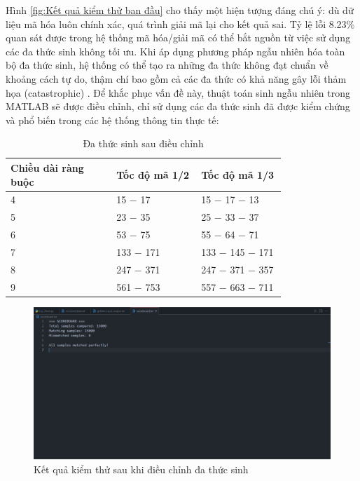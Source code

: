 \documentclass[../DoAn.tex]{subfiles}
\begin{document}
Hình \ref{fig:Kết quả kiểm thử ban đầu} cho thấy một hiện tượng đáng chú ý: dù dữ liệu mã hóa luôn chính xác, quá trình giải mã lại cho kết quả sai. Tỷ lệ lỗi 8.23\% quan sát được trong hệ thống mã hóa/giải mã có thể bắt nguồn từ việc sử dụng các đa thức sinh không tối ưu. Khi áp dụng phương pháp ngẫu nhiên hóa toàn bộ đa thức sinh, hệ thống có thể tạo ra những đa thức không đạt chuẩn về khoảng cách tự do, thậm chí bao gồm cả các đa thức có khả năng gây lỗi thảm họa (catastrophic) \cite{forney_convolutional_1970}\cite{masseyy_inverses_1968}. Để khắc phục vấn đề này, thuật toán sinh ngẫu nhiên trong MATLAB sẽ được điều chỉnh, chỉ sử dụng các đa thức sinh đã được kiểm chứng và phổ biến trong các hệ thống thông tin thực tế:

\begin{table}[H]
\centering{}
    \caption{Đa thức sinh sau điều chỉnh}
    \begin{tabular}{|p{0.3\linewidth} | p{0.24\linewidth} |p{0.24\linewidth}|}
        \hline
        \textbf{Chiều dài ràng buộc} & \textbf{Tốc độ mã 1/2} & \textbf{Tốc độ mã 1/3}\\ \hline\hline
        4  & 15 $-$ 17 & 15 $-$ 17 $-$ 13          \\ \hline
        5   & 23 $-$ 35 & 25 $-$ 33 $-$ 37         \\ \hline
        6   & 53 $-$ 75 & 55 $-$ 64 $-$ 71          \\ \hline
        7  & 133 $-$ 171 & 133 $-$ 145 $-$ 171 \\ \hline
        8 & 247 $-$ 371 & 247 $-$ 371 $-$ 357 \\ \hline
        9 & 561 $-$ 753 & 557 $-$ 663 $-$ 711 \\ \hline
        \end{tabular}
\end{table}

\begin{figure}[H]
    \centering
    \includegraphics[width=\textwidth, height=0.4\textheight, keepaspectratio]{Hinhve/Chuong 4/data_correct.png}
    \caption{Kết quả kiểm thử sau khi điều chỉnh đa thức sinh}
    \label{fig:Kết quả kiểm thử sau}
\end{figure}
\end{document}
